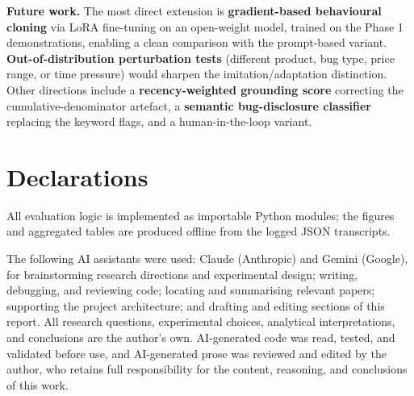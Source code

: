 \documentclass[pdflatex,sn-mathphys-num]{sn-jnl}%
\theoremstyle{thmstyleone}%
\theoremstyle{thmstyletwo}%
\theoremstyle{thmstylethree}%
\begin{document}
\textbf{Future work.} The most direct extension is \textbf{gradient-based behavioural cloning} via LoRA fine-tuning on an open-weight model, trained on the Phase 1 demonstrations, enabling a clean comparison with the prompt-based variant. \textbf{Out-of-distribution perturbation tests} (different product, bug type, price range, or time pressure) would sharpen the imitation/adaptation distinction. Other directions include a \textbf{recency-weighted grounding score} correcting the cumulative-denominator artefact, a \textbf{semantic bug-disclosure classifier} replacing the keyword flags, and a human-in-the-loop variant.

\backmatter

\section*{Declarations}

 All evaluation logic is implemented as importable Python modules; the figures and aggregated tables are produced offline from the logged JSON transcripts.

 The following AI assistants were used: Claude (Anthropic) and Gemini (Google), for brainstorming research directions and experimental design; writing, debugging, and reviewing code; locating and summarising relevant papers; supporting the project architecture; and drafting and editing sections of this report. All research questions, experimental choices, analytical interpretations, and conclusions are the author's own. AI-generated code was read, tested, and validated before use, and AI-generated prose was reviewed and edited by the author, who retains full responsibility for the content, reasoning, and conclusions of this work.

%
\end{document}
